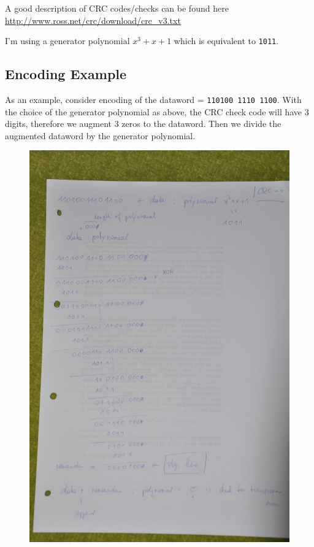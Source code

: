 
A good description of CRC codes/checks can be found here
\url{http://www.ross.net/crc/download/crc_v3.txt}

I'm using a generator polynomial \(x^3 + x + 1\) which is equivalent to
\texttt{1011}.

\subsection{Encoding Example}\label{encoding-example}

As an example, consider encoding of the dataword =
\texttt{110100\ 1110\ 1100}. With the choice of the generator polynomial
as above, the CRC check code will have 3 digits, therefore we augment 3
zeros to the dataword. Then we divide the augmented dataword by the
generator polynomial.

\begin{figure}[H]
\centering
\includegraphics[scale=1.2]{images/DSC_0855_small.JPG}
\end{figure}


